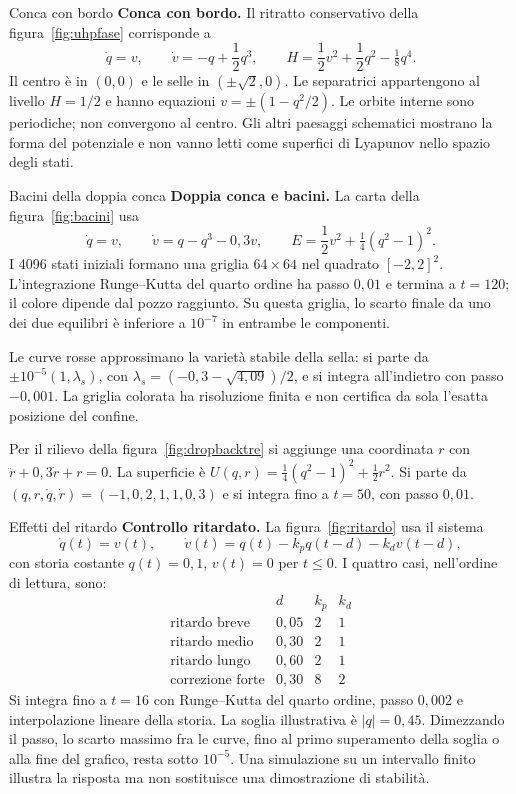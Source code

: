 \documentclass[11pt,a4paper,twoside=false,headinclude,footinclude]{scrartcl}
\begin{document}
\begin{formule}{Conca con bordo}
\textbf{Conca con bordo.} Il ritratto conservativo della figura~\ref{fig:uhpfase} corrisponde a
\[
 \dot q=v,\qquad \dot v=-q+\frac{1}{2}q^3,\qquad
 H=\frac{1}{2}v^2+\frac{1}{2}q^2-\tfrac18q^4.
\]
Il centro è in $(0,0)$ e le selle in $(\pm\sqrt2,0)$. Le separatrici appartengono al livello $H=1/2$ e hanno equazioni $v=\pm(1-q^2/2)$. Le orbite interne sono periodiche; non convergono al centro. Gli altri paesaggi schematici mostrano la forma del potenziale e non vanno letti come superfici di Lyapunov nello spazio degli stati.
\end{formule}

\begin{formule}{Bacini della doppia conca}
\textbf{Doppia conca e bacini.} La carta della figura~\ref{fig:bacini} usa
\[
 \dot q=v,\qquad \dot v=q-q^3-0{,}3v,\qquad
 E=\frac{1}{2}v^2+\tfrac14(q^2-1)^2.
\]
I 4096 stati iniziali formano una griglia $64\times64$ nel quadrato $[-2,2]^2$. L'integrazione Runge--Kutta del quarto ordine ha passo $0{,}01$ e termina a $t=120$; il colore dipende dal pozzo raggiunto. Su questa griglia, lo scarto finale da uno dei due equilibri è inferiore a $10^{-7}$ in entrambe le componenti.

Le curve rosse approssimano la varietà stabile della sella: si parte da $\pm10^{-5}(1,\lambda_s)$, con $\lambda_s=(-0{,}3-\sqrt{4{,}09})/2$, e si integra all'indietro con passo $-0{,}001$. La griglia colorata ha risoluzione finita e non certifica da sola l'esatta posizione del confine.

Per il rilievo della figura~\ref{fig:dropbacktre} si aggiunge una coordinata $r$ con $\ddot r+0{,}3\dot r+r=0$. La superficie è $U(q,r)=\tfrac14(q^2-1)^2+\frac{1}{2}r^2$. Si parte da $(q,r,\dot q,\dot r)=(-1,0{,}2,1{,}1,0{,}3)$ e si integra fino a $t=50$, con passo $0{,}01$.
\end{formule}

\begin{formule}{Effetti del ritardo}
\textbf{Controllo ritardato.} La figura~\ref{fig:ritardo} usa il sistema
\[
 \dot q(t)=v(t),\qquad
 \dot v(t)=q(t)-k_pq(t-d)-k_dv(t-d),
\]
con storia costante $q(t)=0{,}1$, $v(t)=0$ per $t\le0$. I quattro casi, nell'ordine di lettura, sono:
\[
\begin{array}{lccc}
 &d&k_p&k_d\\
 \text{ritardo breve}&0{,}05&2&1\\
 \text{ritardo medio}&0{,}30&2&1\\
 \text{ritardo lungo}&0{,}60&2&1\\
 \text{correzione forte}&0{,}30&8&2
\end{array}
\]
Si integra fino a $t=16$ con Runge--Kutta del quarto ordine, passo $0{,}002$ e interpolazione lineare della storia. La soglia illustrativa è $|q|=0{,}45$. Dimezzando il passo, lo scarto massimo fra le curve, fino al primo superamento della soglia o alla fine del grafico, resta sotto $10^{-5}$. Una simulazione su un intervallo finito illustra la risposta ma non sostituisce una dimostrazione di stabilità.
\end{formule}
\end{document}
